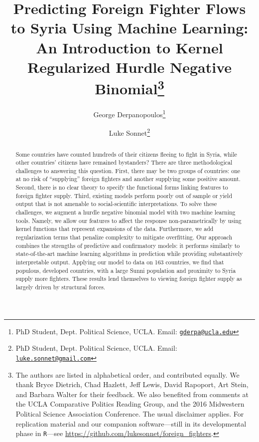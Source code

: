 \documentclass[12pt]{article}
\begin{document}
\title{Predicting Foreign Fighter Flows to Syria Using Machine Learning: An Introduction to Kernel Regularized Hurdle Negative Binomial\thanks{The authors are listed in alphabetical order, and contributed equally. We thank Bryce Dietrich, Chad Hazlett, Jeff Lewis, David Rapoport, Art Stein, and Barbara Walter for their feedback. We also benefited from comments at the UCLA Comparative Politics Reading Group, and the 2016 Midwestern Political Science Association Conference. The usual disclaimer applies. For replication material and our companion software---still in its developmental phase in \texttt{R}---see \href{https://github.com/lukesonnet/foreign\_fighters}{https://github.com/lukesonnet/foreign\_fighters}.}}

\author{George Derpanopoulos\thanks{PhD Student, Dept. Political Science, UCLA. Email: \href{mailto:gderpa@ucla.edu}{\tt gderpa@ucla.edu}} \and Luke Sonnet\thanks{PhD Student, Dept. Political Science, UCLA. Email: \href{mailto:luke.sonnet@gmail.com}{\tt luke.sonnet@gmail.com}}}

	\maketitle
	\thispagestyle{empty} 
	\singlespacing

\begin{abstract}	
Some countries have counted hundreds of their citizens fleeing to fight in Syria, while other countries' citizens have remained bystanders? There are three methodological challenges to answering this question. First, there may be two groups of countries: one at no risk of ``supplying'' foreign fighters and another supplying some positive amount. Second, there is no clear theory to specify the functional forms linking features to foreign fighter supply. Third, existing models perform poorly out of sample or yield output that is not amenable to social-scientific interpretations. To solve these challenges, we augment a hurdle negative binomial model with two machine learning tools. Namely, we allow our features to affect the response non-parametrically by using kernel functions that represent expansions of the data. Furthermore, we add regularization terms that penalize complexity to mitigate overfitting. Our approach combines the strengths of predictive and confirmatory models: it performs similarly to state-of-the-art machine learning algorithms in prediction while providing substantively interpretable output.  Applying our model to data on 163 countries, we find that populous, developed countries, with a large Sunni population and proximity to Syria supply more fighters. These results lend themselves to viewing foreign fighter supply as largely driven by structural forces.
\end{abstract}
\end{document}
